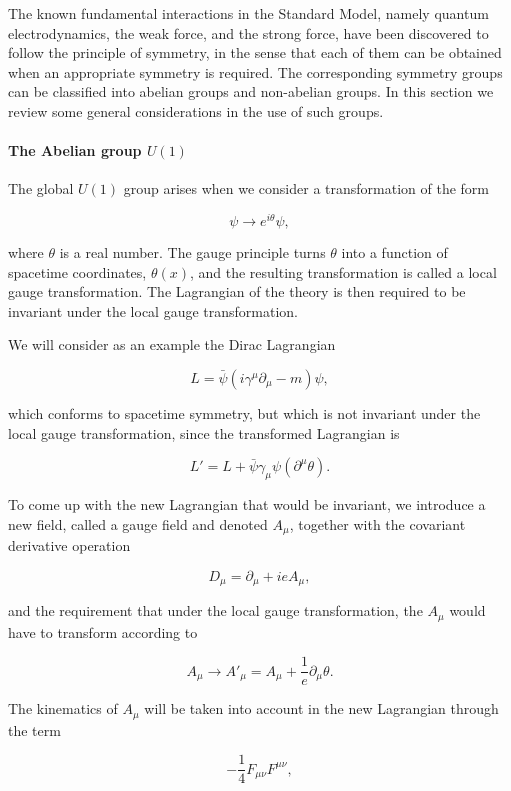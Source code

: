 The known fundamental interactions in the Standard Model, namely quantum
electrodynamics, the weak force, and the strong force, have been discovered to
follow the principle of symmetry, in the sense that each of them can be
obtained when an appropriate symmetry is required. The corresponding symmetry
groups can be classified into abelian groups and non-abelian groups. In this
section we review some general considerations in the use of such groups.



\paragraph{The Abelian group $U(1)$} The global $U(1)$ group arises when we
consider a transformation of the form

\begin{equation}\label{eq:uoneglobal}
	\psi \to e^{i\theta}\psi,
\end{equation}

where $\theta$ is a real number. The gauge principle turns $\theta$ into a
function of spacetime coordinates, $\theta(x)$, and the resulting
transformation is called a local gauge transformation. The Lagrangian of the
theory is then required to be invariant under the local gauge transformation.

We will consider as an example the Dirac Lagrangian

$$L = \bar{\psi}(i\gamma^{\mu}\partial_{\mu} - m)\psi,$$

which conforms to spacetime symmetry, but which is not invariant under the
local gauge transformation, since the transformed Lagrangian is

$$ L' = L + \bar{\psi} \gamma_{\mu} \psi(\partial^{\mu}\theta).$$

To come up with the new Lagrangian that would be invariant, we introduce a new
field, called a gauge field and denoted $A_{\mu}$, together with the covariant
derivative operation

$$ D_{\mu} = \partial_{\mu} + ieA_{\mu},$$

and the requirement that under the local gauge transformation, the $A_{\mu}$
would have to transform according to

$$A_{\mu} \to A'_{\mu} = A_{\mu} + \frac{1}{e}\partial_{\mu}\theta.$$

The kinematics of $A_{\mu}$ will be taken into account in the new Lagrangian
through the term

$$ -\frac{1}{4}F_{\mu\nu}F^{\mu\nu},$$


